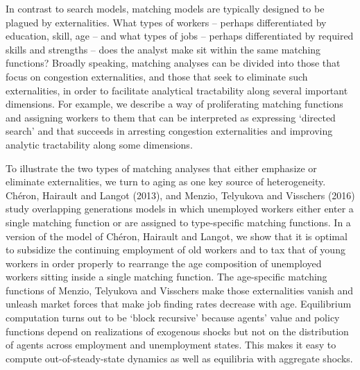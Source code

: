 In contrast to search models, matching models are typically designed to be plagued by
externalities. What types of workers -- perhaps
differentiated by education, skill, age -- and what types of jobs
-- perhaps differentiated by required skills and strengths  --
does the analyst make sit within the same matching functions?
Broadly speaking, matching analyses can be divided into those
that focus on  congestion externalities, and those that
seek to eliminate such  externalities, in order to facilitate analytical
tractability along several important dimensions.   For example, we  describe a way
of proliferating matching functions and  assigning workers to them  that can be interpreted as  expressing
 `directed search' and that succeeds in arresting congestion
externalities and improving analytic tractability along some dimensions.





  
  

To illustrate the two types of matching analyses that either
emphasize or eliminate externalities, we turn to aging as one
key source of heterogeneity. Ch\'eron,
Hairault and Langot (2013), and Menzio, Telyukova and Visschers (2016)
study overlapping generations models in which unemployed
workers either enter a single matching function or are assigned
to type-specific matching functions. In a version of the
model of Ch\'eron, Hairault and Langot, we show that it is optimal  to subsidize the continuing employment
of old workers and to tax that of young workers  in order properly
to rearrange  the age composition of  unemployed workers sitting inside
 a single matching function. The
age-specific matching functions of
Menzio, Telyukova and Visschers make
those externalities vanish and unleash market forces that make job finding rates decrease with
 age.
Equilibrium computation  turns out to be `block recursive' because agents' value and policy functions depend on
realizations of  exogenous shocks but not on the distribution
of agents across employment and unemployment states. This
makes it easy to compute out-of-steady-state dynamics
as well as equilibria with aggregate shocks.


